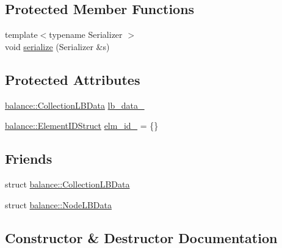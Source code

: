 \subsection*{Protected Member Functions}
\begin{DoxyCompactItemize}
\item 
{\footnotesize template$<$typename Serializer $>$ }\\void \hyperlink{structvt_1_1vrt_1_1collection_1_1_migratable_a2ff02da700394ecd37f3fbb6f0724a3e}{serialize} (Serializer \&s)
\end{DoxyCompactItemize}
\subsection*{Protected Attributes}
\begin{DoxyCompactItemize}
\item 
\hyperlink{structvt_1_1vrt_1_1collection_1_1balance_1_1_collection_l_b_data}{balance\+::\+Collection\+L\+B\+Data} \hyperlink{structvt_1_1vrt_1_1collection_1_1_migratable_ac910af17909a000a421c83a959c33970}{lb\+\_\+data\+\_\+}
\item 
\hyperlink{namespacevt_1_1vrt_1_1collection_1_1balance_a9f5b53fafb270212279a4757d2c4cd28}{balance\+::\+Element\+I\+D\+Struct} \hyperlink{structvt_1_1vrt_1_1collection_1_1_migratable_aef4c21c94ff642a460c5686ec4944c51}{elm\+\_\+id\+\_\+} = \{\}
\end{DoxyCompactItemize}
\subsection*{Friends}
\begin{DoxyCompactItemize}
\item 
struct \hyperlink{structvt_1_1vrt_1_1collection_1_1_migratable_a3327134906c684111aa2604d0b68b2f0}{balance\+::\+Collection\+L\+B\+Data}
\item 
struct \hyperlink{structvt_1_1vrt_1_1collection_1_1_migratable_a25f0faff0429ef935b8f8694e9320d4e}{balance\+::\+Node\+L\+B\+Data}
\end{DoxyCompactItemize}


\subsection{Constructor \& Destructor Documentation}
\mbox{\label{structvt_1_1vrt_1_1collection_1_1_migratable_a598f0bb3acfb602d437eab3625b105c5}} 
